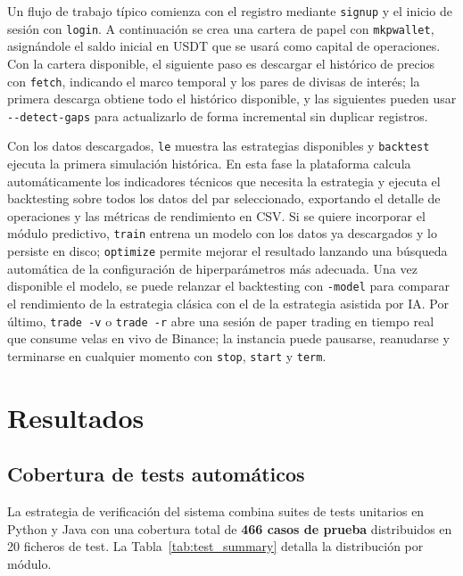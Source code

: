 Un flujo de trabajo típico comienza con el registro mediante \texttt{signup} y el
inicio de sesión con \texttt{login}. A continuación se crea una cartera de papel con
\texttt{mkpwallet}, asignándole el saldo inicial en USDT que se usará como capital de
operaciones. Con la cartera disponible, el siguiente paso es descargar el histórico de
precios con \texttt{fetch}, indicando el marco temporal y los pares de divisas de
interés; la primera descarga obtiene todo el histórico disponible, y las siguientes
pueden usar \texttt{-{}-detect-gaps} para actualizarlo de forma incremental sin
duplicar registros.

Con los datos descargados, \texttt{le} muestra las estrategias disponibles y
\texttt{backtest} ejecuta la primera simulación histórica. En esta fase la plataforma
calcula automáticamente los indicadores técnicos que necesita la estrategia y ejecuta
el backtesting sobre todos los datos del par seleccionado, exportando el detalle de
operaciones y las métricas de rendimiento en CSV. Si se quiere incorporar el módulo
predictivo, \texttt{train} entrena un modelo con los datos ya descargados y lo persiste
en disco; \texttt{optimize} permite mejorar el resultado lanzando una búsqueda
automática de la configuración de hiperparámetros más adecuada. Una vez disponible el
modelo, se puede relanzar el backtesting con \texttt{-model} para comparar el
rendimiento de la estrategia clásica con el de la estrategia asistida por IA. Por
último, \texttt{trade -v} o \texttt{trade -r} abre una sesión de paper trading en
tiempo real que consume velas en vivo de Binance; la instancia puede pausarse, reanudarse
y terminarse en cualquier momento con \texttt{stop}, \texttt{start} y \texttt{term}.

\section{Resultados}
\label{sec:resultados}

\subsection{Cobertura de tests automáticos}
\label{sec:tests}

La estrategia de verificación del sistema combina suites de tests unitarios en Python
y Java con una cobertura total de \textbf{466 casos de prueba} distribuidos en 20
ficheros de test. La Tabla~\ref{tab:test_summary} detalla la distribución por módulo.

